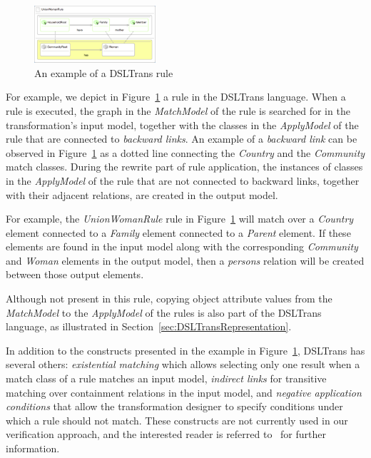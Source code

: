  \begin{figure}[t]
   \begin{center}
     \includegraphics[width=0.40\textwidth]{figures/FamToPersons/UWRule}
     \caption{An example of a DSLTrans rule}
     \label{fig:DSLTrans_rule}
   \end{center}
   \vspace{-0.25in}
 \end{figure}

For example, we depict in Figure~\ref{fig:DSLTrans_rule} a
rule in the DSLTrans language.
When a rule is executed, the graph in the \emph{MatchModel} of the rule is searched for in the transformation's input model, together with the classes in the \emph{ApplyModel} of the rule that are connected to \emph{backward
links}. An example of a \emph{backward link} can be observed in
Figure~\ref{fig:DSLTrans_rule} as a dotted line connecting the \emph{Country} and the
\emph{Community} match classes. During the rewrite part of rule application,
the instances of classes in the \emph{ApplyModel} of the rule that are not connected to
backward links, together with their adjacent relations, are created in the
output model.

For example, the \emph{UnionWomanRule} rule in Figure~\ref{fig:DSLTrans_rule} will match over a \emph{Country} element connected to a \emph{Family} element connected to a \emph{Parent} element. If these elements are found in the input model along with the corresponding \emph{Community} and \emph{Woman} elements in the output model, then a \emph{persons} relation will be created between those output elements.

Although not present in this rule,
copying object attribute values from the \emph{MatchModel} to the \emph{ApplyModel} of the rules is
also part of the DSLTrans language, as illustrated in Section~\ref{sec:DSLTransRepresentation}.


In addition to the constructs presented in the example in
Figure~\ref{fig:DSLTrans_rule}, DSLTrans has several others:
\emph{existential matching} which allows selecting only one result when a match class of a rule
matches an input model, \emph{indirect links} for transitive matching
over containment relations in the input model, and \emph{negative application
conditions} that allow the transformation designer to specify conditions under
which a rule should not match. These constructs are not currently used in
our verification approach, and the interested reader is referred to~\cite{Barroca2011} for further information.

